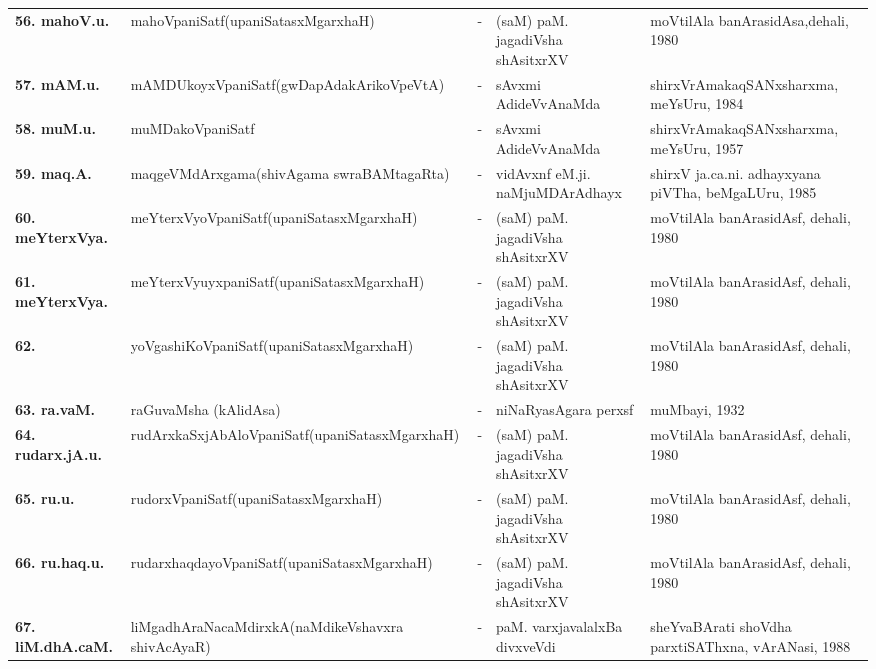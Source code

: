 {\begin{longtable}{@{}lp{5cm}cp{5cm}<{\raggedright}p{3cm}<{\raggedright}@{}}
{\bf 56. mahoV.u.} & mahoVpaniSatf\newline (upaniSatasxMgarxhaH) &-& (saM) paM. jagadiVsha shAsitxrXV & moVtilAla banArasidAsa,\newline dehali, 1980\\
{\bf 57. mAM.u.} & mAMDUkoyxVpaniSatf\newline (gwDapAdakArikoVpeVtA) &-& sAvxmi AdideVvAnaMda & shirxVrAmakaqSANxsharxma, meYsUru, 1984\\
{\bf 58. muM.u.} & muMDakoVpaniSatf &-& sAvxmi AdideVvAnaMda & shirxVrAmakaqSANxsharxma, meYsUru, 1957\\
{\bf 59. maq.A.} & maqgeVMdArxgama\newline (shivAgama swraBAMtagaRta) &-& vidAvxnf eM.ji. naMjuMDArAdhayx & shirxV ja.ca.ni. adhayxyana piVTha, beMgaLUru, 1985\\
{\bf 60. meYterxVya.} & meYterxVyoVpaniSatf\newline (upaniSatasxMgarxhaH) &-& (saM) paM. jagadiVsha shAsitxrXV & moVtilAla banArasidAsf, dehali, 1980\\
{\bf 61. meYterxVya.} & meYterxVyuyxpaniSatf\newline (upaniSatasxMgarxhaH) &-& (saM) paM. jagadiVsha shAsitxrXV & moVtilAla banArasidAsf, dehali, 1980\\
{\bf 62. } & yoVgashiKoVpaniSatf\newline (upaniSatasxMgarxhaH) &-& (saM) paM. jagadiVsha shAsitxrXV & moVtilAla banArasidAsf, dehali, 1980\\
{\bf 63. ra.vaM.} & raGuvaMsha (kAlidAsa) &-& niNaRyasAgara perxsf & muMbayi, 1932\\
{\bf 64. rudarx.jA.u.} & rudArxkaSxjAbAloVpaniSatf\newline (upaniSatasxMgarxhaH) &-& (saM) paM. jagadiVsha shAsitxrXV & moVtilAla banArasidAsf, dehali, 1980\\
{\bf 65. ru.u.} & rudorxVpaniSatf\newline (upaniSatasxMgarxhaH) &-& (saM) paM. jagadiVsha shAsitxrXV & moVtilAla banArasidAsf, dehali, 1980\\
{\bf 66. ru.haq.u.} & rudarxhaqdayoVpaniSatf\newline (upaniSatasxMgarxhaH) &-& (saM) paM. jagadiVsha shAsitxrXV & moVtilAla banArasidAsf, dehali, 1980\\
{\bf 67. liM.dhA.caM.} & liMgadhAraNacaMdirxkA\newline (naMdikeVshavxra shivAcAyaR) &-& paM. varxjavalalxBa divxveVdi & sheYvaBArati shoVdha parxtiSAThxna, vArANasi, 1988\\

\end{longtable}}
